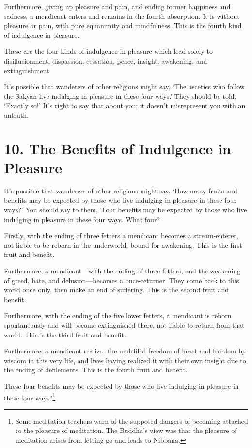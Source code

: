 \documentclass[12pt,openany]{book}%
\begin{document}
Furthermore, giving up pleasure and pain, and ending former happiness and sadness, a mendicant enters and remains in the fourth absorption. It is without pleasure or pain, with pure equanimity and mindfulness. This is the fourth kind of indulgence in pleasure. 

These are the four kinds of indulgence in pleasure which lead solely to disillusionment, dispassion, cessation, peace, insight, awakening, and extinguishment. 

It’s possible that wanderers of other religions might say, ‘The ascetics who follow the Sakyan live indulging in pleasure in these four ways.’ They should be told, ‘Exactly so!’ It’s right to say that about you; it doesn’t misrepresent you with an untruth. 

\section*{10. The Benefits of Indulgence in Pleasure }

It’s possible that wanderers of other religions might say, ‘How many fruits and benefits may be expected by those who live indulging in pleasure in these four ways?’ You should say to them, ‘Four benefits may be expected by those who live indulging in pleasure in these four ways. What four? 

Firstly, with the ending of three fetters a mendicant becomes a stream-enterer, not liable to be reborn in the underworld, bound for awakening. This is the first fruit and benefit. 

Furthermore, a mendicant—with the ending of three fetters, and the weakening of greed, hate, and delusion—becomes a once-returner. They come back to this world once only, then make an end of suffering. This is the second fruit and benefit. 

Furthermore, with the ending of the five lower fetters, a mendicant is reborn spontaneously and will become extinguished there, not liable to return from that world. This is the third fruit and benefit. 

Furthermore, a mendicant realizes the undefiled freedom of heart and freedom by wisdom in this very life, and lives having realized it with their own insight due to the ending of defilements. This is the fourth fruit and benefit. 

These four benefits may be expected by those who live indulging in pleasure in these four ways.’\footnote{Some meditation teachers warn of the supposed dangers of becoming attached to the pleasure of meditation. The Buddha’s view was that the pleasure of meditation arises from letting go and leads to Nibbana. } 
\end{document}

